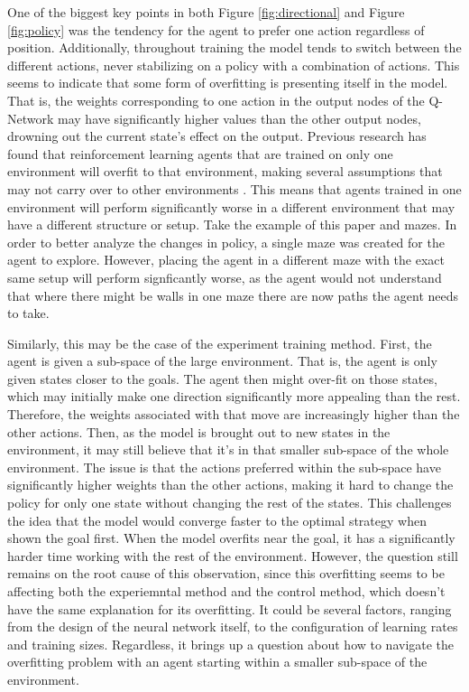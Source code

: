 \documentclass[12pt]{article}
\begin{document}
One of the biggest key points in both Figure \ref{fig:directional} and Figure \ref{fig:policy} was the tendency for the agent to prefer one action regardless of position.
Additionally, throughout training the model tends to switch between the different actions, never stabilizing on a policy with a combination of actions.
This seems to indicate that some form of overfitting is presenting itself in the model.
That is, the weights corresponding to one action in the output nodes of the Q-Network may have significantly higher values than the other output nodes, drowning out the current state's effect on the output.
Previous research has found that reinforcement learning agents that are trained on only one environment will overfit to that environment, making several assumptions that may not carry over to other environments \cite{article_overfitting_neural_networks}.
This means that agents trained in one environment will perform significantly worse in a different environment that may have a different structure or setup.
Take the example of this paper and mazes. In order to better analyze the changes in policy, a single maze was created for the agent to explore.
However, placing the agent in a different maze with the exact same setup will perform signficantly worse, as the agent would not understand that where there might be walls in one maze there are now paths the agent needs to take.

Similarly, this may be the case of the experiment training method.
First, the agent is given a sub-space of the large environment.
That is, the agent is only given states closer to the goals.
The agent then might over-fit on those states, which may initially make one direction significantly more appealing than the rest.
Therefore, the weights associated with that move are increasingly higher than the other actions.
Then, as the model is brought out to new states in the environment, it may still believe that it's in that smaller sub-space of the whole environment.
The issue is that the actions preferred within the sub-space have significantly higher weights than the other actions, making it hard to change the policy for only one state without changing the rest of the states.
This challenges the idea that the model would converge faster to the optimal strategy when shown the goal first.
When the model overfits near the goal, it has a significantly harder time working with the rest of the environment.
However, the question still remains on the root cause of this observation, since this overfitting seems to be affecting both the experiemntal method and the control method, which doesn't have the same explanation for its overfitting.
It could be several factors, ranging from the design of the neural network itself, to the configuration of learning rates and training sizes.
Regardless, it brings up a question about how to navigate the overfitting problem with an agent starting within a smaller sub-space of the environment.
\end{document}
